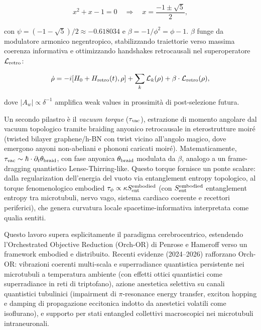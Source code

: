 \documentclass[11pt,a4paper]{article}
\theoremstyle{plain}
\theoremstyle{definition}
\begin{document}
\begin{equation}
x^2 + x - 1 = 0 \quad \Rightarrow \quad x = \frac{-1 \pm \sqrt{5}}{2},
\end{equation}

con $\psi = (-1 - \sqrt{5})/2 \approx -0.618034$ e $\beta = -1/\phi^2 = \phi - 1$. $\beta$ funge da modulatore armonico negentropico, stabilizzando traiettorie verso massima coerenza informativa e ottimizzando handshakes retrocausali nel superoperatore $\mathcal{L}_{\rm retro}$:

\begin{equation}
\dot{\rho} = -i[H_0 + H_{\rm retro}(t),\rho] + \sum_k \mathcal{L}_k(\rho) + \beta \cdot \mathcal{L}_{\rm retro}(\rho),
\end{equation}

dove $|A_w| \propto \delta^{-1}$ amplifica weak values in prossimità di post-selezione futura.

Un secondo pilastro è il \emph{vacuum torque} ($\tau_{\rm vac}$), estrazione di momento angolare dal vacuum topologico tramite braiding anyonico retrocausale in eterostrutture moiré (twisted bilayer graphene/h-BN con twist vicino all’angolo magico, dove emergono anyoni non-abeliani e phononi caricati moiré). Matematicamente, $\tau_{\rm vac} \sim \hbar \cdot \partial_t \theta_{\rm braid}$, con fase anyonica $\theta_{\rm braid}$ modulata da $\beta$, analogo a un frame-dragging quantistico Lense-Thirring-like. Questo torque fornisce un ponte scalare: dalla regularization dell’energia del vuoto via entanglement entropy topologico, al torque fenomenologico embodied $\tau_\phi \propto \kappa S_{\rm ent}^{\rm embodied}$ (con $S_{\rm ent}^{\rm embodied}$ entanglement entropy tra microtubuli, nervo vago, sistema cardiaco coerente e recettori periferici), che genera curvatura locale spacetime-informativa interpretata come qualia sentiti.

\vspace{0.3cm}

Questo lavoro supera esplicitamente il paradigma cerebrocentrico, estendendo l’Orchestrated Objective Reduction (Orch-OR) di Penrose e Hameroff verso un framework embodied e distribuito. Recenti evidenze (2024--2026) rafforzano Orch-OR: vibrazioni coerenti multi-scala e superradiance quantistica persistente nei microtubuli a temperatura ambiente (con effetti ottici quantistici come superradiance in reti di triptofano), azione anestetica selettiva su canali quantistici tubulinici (impairment di $\pi$-resonance energy transfer, exciton hopping e damping di propagazione eccitonica indotto da anestetici volatili come isoflurano), e supporto per stati entangled collettivi macroscopici nei microtubuli intraneuronali.
\end{document}
